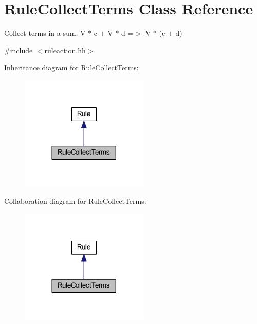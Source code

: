 \hypertarget{class_rule_collect_terms}{}\section{Rule\+Collect\+Terms Class Reference}
\label{class_rule_collect_terms}


Collect terms in a sum\+: {\ttfamily V $\ast$ c + V $\ast$ d =$>$ V $\ast$ (c + d)}  




{\ttfamily \#include $<$ruleaction.\+hh$>$}



Inheritance diagram for Rule\+Collect\+Terms\+:
\nopagebreak
\begin{figure}[H]
\begin{center}
\leavevmode
\includegraphics[width=173pt]{class_rule_collect_terms__inherit__graph}
\end{center}
\end{figure}


Collaboration diagram for Rule\+Collect\+Terms\+:
\nopagebreak
\begin{figure}[H]
\begin{center}
\leavevmode
\includegraphics[width=173pt]{class_rule_collect_terms__coll__graph}
\end{center}
\end{figure}
